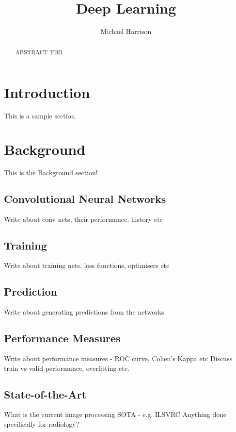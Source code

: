 \documentclass[11pt]{article} %
\title{Deep Learning}
\author{Michael Harrison}
\theoremstyle{plain}
\theoremstyle{definition}
\begin{document}
\maketitle

\declaration

\begin{abstract}
  ABSTRACT TBD
\end{abstract}

\listoffigures


\newpage
\section{Introduction}

This is a sample section.



\newpage
\section{Background}
This is the Background section!

\subsection{Convolutional Neural Networks}
Write about conv nets, their performance, history etc

\subsection{Training}
Write about training nets, loss functions, optimisers etc

\subsection{Prediction}
Write about generating predictions from the networks

\subsection{Performance Measures}
Write about performance measures - ROC curve, Cohen's Kappa etc
Discuss train vs valid performance, overfitting etc.

\subsection{State-of-the-Art}
What is the current image processing SOTA - e.g. ILSVRC
Anything done specifically for radiology?
\end{document}

